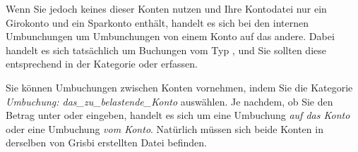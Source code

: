 Wenn Sie jedoch keines dieser Konten nutzen und Ihre Kontodatei nur ein Girokonto und ein Sparkonto enthält, handelt es sich bei den internen Umbunchungen um Umbunchungen von einem Konto auf das andere. Dabei handelt es sich tatsächlich um Buchungen vom Typ , und Sie sollten diese entsprechend in der Kategorie  oder  erfassen.

Sie können Umbuchungen zwischen Konten vornehmen, indem Sie die Kategorie \emph{Umbuchung: das\_zu\_belastende\_Konto} auswählen. Je nachdem, ob Sie den Betrag unter  oder  eingeben, handelt es sich um eine Umbuchung \emph{auf das Konto} oder eine Umbuchung \emph{vom Konto}. Natürlich müssen sich beide Konten in derselben von Grisbi erstellten Datei befinden.

